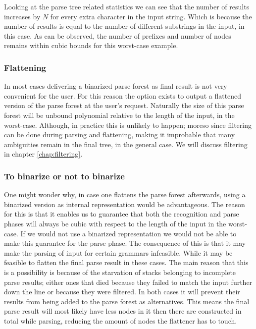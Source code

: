 \documentclass[a4paper,10pt]{article}
\begin{document}
Looking at the parse tree related statistics we can see that the number of results increases by $N$ for every extra character in the input string. Which is because the number of results is equal to the number of different substrings in the input, in this case. As can be observed, the number of prefixes and number of nodes remains within cubic bounds for this worst-case example.

\subsubsection{Flattening}
In most cases delivering a binarized parse forest as final result is not very convenient for the user. For this reason the option exists to output a flattened version of the parse forest at the user's request. Naturally the size of this parse forest will be unbound polynomial relative to the length of the input, in the worst-case. Although, in practice this is unlikely to happen; moreso since filtering can be done during parsing and flattening, making it improbable that many ambiguities remain in the final tree, in the general case. We will discuss filtering in chapter \ref{chap:filtering}.

\subsubsection{To binarize or not to binarize}
\label{subsec:Binarization}
One might wonder why, in case one flattens the parse forest afterwards, using a binarized version as internal representation would be advantageous. The reason for this is that it enables us to guarantee that both the recognition and parse phases will always be cubic with respect to the length of the input in the worst-case. If we would not use a binarized representation we would not be able to make this guarantee for the parse phase. The consequence of this is that it may make the parsing of input for certain grammars infeasible. While it may be feasible to flatten the final parse result in these cases. The main reason that this is a possibility is because of the starvation of stacks belonging to incomplete parse results; either ones that died because they failed to match the input further down the line or because they were filtered. In both cases it will prevent their results from being added to the parse forest as alternatives. This means the final parse result will most likely have less nodes in it then there are constructed in total while parsing, reducing the amount of nodes the flattener has to touch.
\end{document}
